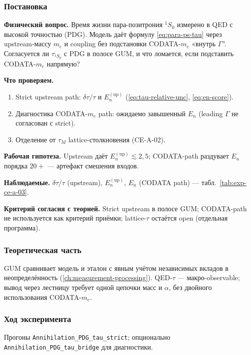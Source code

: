 \label{exp:cea03}

\subsubsection*{Постановка}
\textbf{Физический вопрос.}
Время жизни пара-позитрония $^1S_0$ измерено в QED с высокой точностью (PDG).
Модель даёт формулу \eqref{eq:para-ps-tau} через upstream-массу $m_e$ и coupling без подстановки CODATA-$m_e$ «внутрь $\Gamma$''.
Согласуется ли $\tau_{^1S_0}$ с PDG в полосе GUM, и что ломается, если подставить CODATA-$m_e$ напрямую?

\textbf{Что проверяем.}
\begin{enumerate}[label=\textbf{(\alph*)},leftmargin=*,itemsep=0.25em]
\item Strict upstream path: $\delta\tau/\tau$ и $E_n^{(\mathrm{up})}$ (\eqref{eq:tau-relative-unc}, \eqref{eq:en-score}).
\item Диагностика CODATA-$m_e$ path: ожидаемо завышенный $E_n$ (leading $\Gamma$ не согласован с strict).
\item Отделение от $\tau_M$ lattice-столкновения (CE-A-02).
\end{enumerate}

\textbf{Рабочая гипотеза.}
Upstream даёт $E_n^{(\mathrm{up})}\lesssim 2{,}5$; CODATA-path раздувает $E_n$ порядка $20+$ --- артефакт смешения входов.

\textbf{Наблюдаемые.}
$\delta\tau/\tau$ (upstream), $E_n^{(\mathrm{up})}$, $E_n$ (CODATA path) --- табл.~\ref{tab:exp-ce-a-03}.

\textbf{Критерий согласия с теорией.}
Strict upstream в полосе GUM; CODATA-path не используется как критерий приёмки; lattice-$\tau$ остаётся open (отдельная программа).

\subsubsection*{Теоретическая часть}
GUM сравнивает модель и эталон с явным учётом независимых вкладов в неопределённость (\cref{ch:measurement-processing}).
QED-$\tau$ --- макро-observable; вывод через лестницу требует одной цепочки масс и $\alpha$, без двойного использования CODATA-$m_e$.

\subsubsection*{Ход эксперимента}
Прогоны \texttt{Annihilation\_PDG\_tau\_strict}; опционально \texttt{Annihilation\_PDG\_tau\_bridge} для диагностики.

